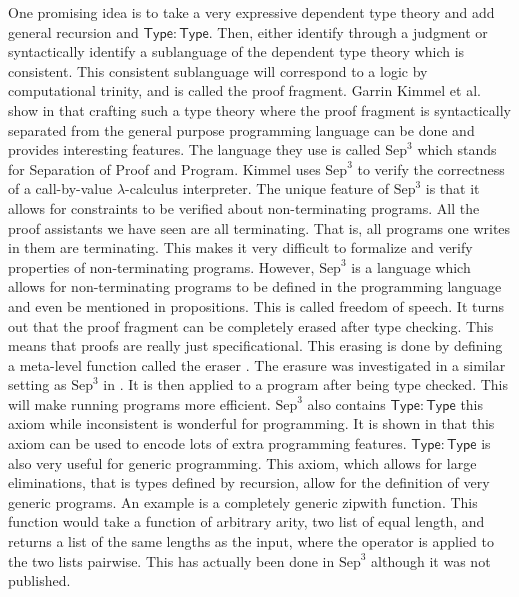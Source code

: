 One promising idea is to take a very expressive dependent type theory
and add general recursion and $\mathsf{Type:Type}$.  Then, either
identify through a judgment or syntactically identify a sublanguage of
the dependent type theory which is consistent.  This consistent
sublanguage will correspond to a logic by computational trinity, and
is called the proof fragment.  Garrin Kimmel et al. show in
\cite{Kimmel:2012} that crafting such a type theory where the proof
fragment is syntactically separated from the general purpose
programming language can be done and provides interesting features.
The language they use is called $\text{Sep}^3$ which stands for
Separation of Proof and Program. Kimmel uses $\text{Sep}^3$ to verify
the correctness of a call-by-value $\lambda$-calculus interpreter.
The unique feature of $\text{Sep}^3$ is that it allows for constraints
to be verified about non-terminating programs.  All the proof
assistants we have seen are all terminating.  That is, all programs
one writes in them are terminating.  This makes it very difficult to
formalize and verify properties of non-terminating programs.  However,
$\text{Sep}^3$ is a language which allows for non-terminating programs
to be defined in the programming language and even be mentioned in
propositions.  This is called freedom of speech.  It turns out that
the proof fragment can be completely erased after type checking.  This
means that proofs are really just specificational.  This erasing is
done by defining a meta-level function called the eraser
\cite{Mishra-Linger:2008}.  The erasure was investigated in a similar
setting as $\text{Sep}^3$ in \cite{Sjoberg:2012}.  It is then applied
to a program after being type checked.  This will make running
programs more efficient.  $\text{Sep}^3$ also contains
$\mathsf{Type:Type}$ this axiom while inconsistent is wonderful for
programming.  It is shown in \cite{Cardelli-1986} that this axiom can
be used to encode lots of extra programming features.
$\mathsf{Type:Type}$ is also very useful for generic
programming.
This axiom, which allows for large eliminations, that is types defined
by recursion, allow for the definition of very generic programs.  An
example is a completely generic zipwith function.  This function would
take a function of arbitrary arity, two list of equal length, and
returns a list of the same lengths as the input, where the operator is
applied to the two lists pairwise.  This has actually been done in
$\text{Sep}^3$ although it was not published.

